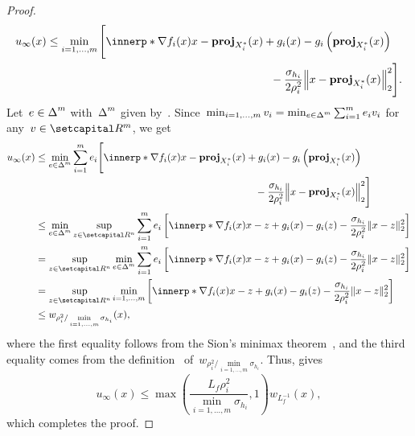 \documentclass[../main]{subfiles}
\begin{document}
\begin{proof}
\begin{equation}
        u_\infty(x) \le \min_{i = 1, \dots, m}
            \begin{multlined}[t]
                \Biggl[ \innerp*{\nabla f_i(x)}{x - \proj_{X_i^*}(x)} + g_i(x) - g_i\left( \proj_{X_i^*}(x) \right) \\
                    - \frac{\sigma_{h_i}}{2 \rho_i^2} \norm*{x - \proj_{X_i^*}(x)}_2^2 \Biggr]
            .\end{multlined}
    \end{equation}
    Let~$e \in \operatorname{\Delta}^m$ with~$\operatorname{\Delta}^m$ given by~.
    Since~$\min_{i = 1, \dots, m} v_i = \min_{e \in \operatorname{\Delta}^m} \sum_{i = 1}^{m} e_i v_i$ for any~$v \in \setR^m$, we get
    \begin{align}
        u_\infty(x) &\le \min_{e \in \simplex^m} \sum_{i = 1}^{m} e_i
            \begin{multlined}[t]
                \Biggl[ \innerp*{\nabla f_i(x)}{x - \proj_{X_i^*}(x)} + g_i(x) - g_i\left( \proj_{X_i^*}(x) \right) \\
                    - \frac{\sigma_{h_i}}{2 \rho_i^2} \norm*{x - \proj_{X_i^*}(x)}_2^2 \Biggr]
            \end{multlined} \\
        &\le \min_{e \in \simplex^m} \sup_{z \in \setR^n} \sum_{i = 1}^{m} e_i \left[ \innerp*{\nabla f_i(x)}{x - z} + g_i(x) - g_i(z) - \frac{\sigma_{h_i}}{2 \rho_i^2} \norm{x - z}_2^2 \right] \\
        &= \sup_{z \in \setR^n} \min_{e \in \simplex^m} \sum_{i = 1}^{m} e_i \left[ \innerp*{\nabla f_i(x)}{x - z} + g_i(x) - g_i(z) - \frac{\sigma_{h_i}}{2 \rho_i^2} \norm{x - z}_2^2 \right] \\
        &= \sup_{z \in \setR^n} \min_{i = 1, \dots, m} \left[ \innerp*{\nabla f_i(x)}{x - z} + g_i(x) - g_i(z) - \frac{\sigma_{h_i}}{2 \rho_i^2} \norm{x - z}_2^2 \right] \\
        &\le w_{\rho_i^2 / \min\limits_{i = 1, \dots, m} \sigma_{h_i}}(x)
    ,\end{align}
    where the first equality follows from the Sion's minimax theorem~\cite{Sion1958}, and the third equality comes from the definition~ of~$w_{\rho_i^2 / \min\limits_{i = 1, \dots, m} \sigma_{h_i}}$.
    Thus,  gives
    \begin{equation}
        u_\infty(x) \le \max \left( \frac{L_f \rho_i^2}{\min\limits_{i = 1, \dots, m} \sigma_{h_i}} , 1 \right) w_{L_f^{-1}}(x)
    ,\end{equation}
    which completes the proof.
\end{proof}
\end{document}

